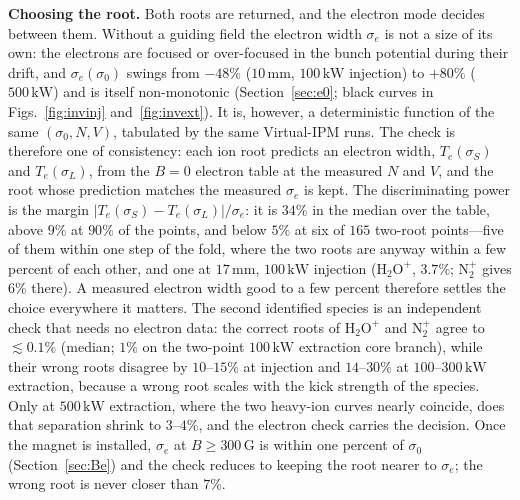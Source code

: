 \documentclass[hyperref]{cernrep}
\begin{document}
\medskip\noindent\textbf{Choosing the root.}
Both roots are returned, and the electron mode decides between them.
Without a guiding field the electron width $\sigma_e$ is not a size
of its own: the electrons are focused or over-focused in the bunch
potential during their drift, and $\sigma_e(\sigma_0)$ swings from
$-48\%$ ($10\,\mathrm{mm}$, $100\,\mathrm{kW}$ injection) to $+80\%$
($500\,\mathrm{kW}$) and is itself non-monotonic
(Section~\ref{sec:e0}; black curves in Figs.~\ref{fig:invinj}
and~\ref{fig:invext}). It is, however, a deterministic function of the
same $(\sigma_0,N,V)$, tabulated by the same Virtual-IPM runs. The
check is therefore one of consistency: each ion root predicts an
electron width, $T_e(\sigma_S)$ and $T_e(\sigma_L)$, from the $B=0$
electron table at the measured $N$ and $V$, and the root whose
prediction matches the measured $\sigma_e$ is kept. The discriminating
power is the margin $|T_e(\sigma_S)-T_e(\sigma_L)|/\sigma_e$: it is
$34\%$ in the median over the table, above $9\%$ at $90\%$ of the
points, and below $5\%$ at six of $165$ two-root points---five of them
within one step of the fold, where the two roots are anyway within a
few percent of each other, and one at $17\,\mathrm{mm}$,
$100\,\mathrm{kW}$ injection ($\mathrm{H}_2\mathrm{O}^+$, $3.7\%$;
$\mathrm{N}_2^+$ gives $6\%$ there). A measured electron width good to
a few percent therefore settles the choice everywhere it matters. The
second identified species is an independent check that needs no
electron data: the correct roots of $\mathrm{H}_2\mathrm{O}^+$ and
$\mathrm{N}_2^+$ agree to $\lesssim 0.1\%$ (median; $1\%$ on the
two-point $100\,\mathrm{kW}$ extraction core branch), while their
wrong roots disagree by $10$--$15\%$ at injection and $14$--$30\%$ at
$100$--$300\,\mathrm{kW}$ extraction, because a wrong root scales with
the kick strength of the species. Only at $500\,\mathrm{kW}$
extraction, where the two heavy-ion curves nearly coincide, does that
separation shrink to $3$--$4\%$, and the electron check carries the
decision. Once the magnet is installed, $\sigma_e$ at
$B\ge 300\,\mathrm{G}$ is within one percent of $\sigma_0$
(Section~\ref{sec:Be}) and the check reduces to keeping the root
nearer to $\sigma_e$; the wrong root is never closer than $7\%$.
\end{document}
